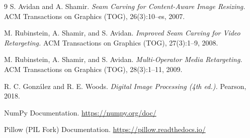 \documentclass[12pt,a4paper]{article}
\begin{document}
\newpage
{}
{}

\begin{thebibliography}{9}
\def\refname{References}
 S. Avidan and A. Shamir.
    \emph{Seam Carving for Content-Aware Image Resizing.}
    ACM Transactions on Graphics (TOG), 26(3):10--es, 2007.

 M. Rubinstein, A. Shamir, and S. Avidan.
    \emph{Improved Seam Carving for Video Retargeting.}
    ACM Transactions on Graphics (TOG), 27(3):1--9, 2008.

 M. Rubinstein, A. Shamir, and S. Avidan.
    \emph{Multi-Operator Media Retargeting.}
    ACM Transactions on Graphics (TOG), 28(3):1--11, 2009.

 R. C. Gonz\'alez and R. E. Woods.
    \emph{Digital Image Processing (4th ed.).}
    Pearson, 2018.

 NumPy Documentation. \url{https://numpy.org/doc/}

 Pillow (PIL Fork) Documentation. \url{https://pillow.readthedocs.io/}
\end{thebibliography}
\end{document}
